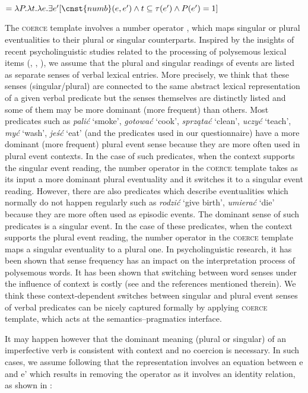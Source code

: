 \documentclass[output=paper]{langscibook}
\begin{document}
\ea {} $= \lambda P. \lambda t.\lambda e. \exists e' [\cnst{numb} (e, e') \wedge t \subseteq \tau(e') \wedge P(e')=1]$\label{jan-bla:fansb:kb:ex30}
\z 

\noindent The \textsc{coerce} template involves a number operator , which maps singular or plural eventualities to their plural or singular counterparts. Inspired by the insights of recent psycholinguistic studies related to the processing of polysemous lexical items (\citealt{KleinandMurphy2002}, \citealt{PylkkanenLlinasandMurphy2006}, \citealt{Frisson2015}), we assume that the plural and singular readings of events are listed as separate senses of verbal lexical entries. More precisely, we think that these senses (singular/plural) are connected to the same abstract lexical representation of a given verbal predicate but the senses themselves are distinctly listed and some of them may be more dominant (more frequent) than others.  Most predicates such as \textit{palić} ‘smoke’, \textit{gotować} ‘cook’, \textit{sprzątać} ‘clean’, \textit{uczyć} ‘teach’, \textit{myć} ‘wash’, \textit{jeść} ‘eat’ (and the predicates used in our questionnaire) have a more dominant (more frequent) plural event sense because they are more often used in plural event contexts. In the case of such predicates, when the context supports the singular event reading, the number operator in the \textsc{coerce} template takes as its input a more dominant plural eventuality and it switches it to a singular event reading. However, there are also predicates which describe eventualities which normally do not happen regularly such as \textit{rodzić} ‘give birth’, \textit{umierać} ‘die’ because they are more often used as episodic events. The dominant sense of such predicates is a singular event. In the case of these predicates, when the context supports the plural event reading, the number operator in the \textsc{coerce} template maps a singular eventuality to a plural one. In psycholinguistic research, it has been shown that sense frequency has an impact on the interpretation process of polysemous words. It has been shown that switching between word senses under the influence of context is costly (see \citealt{Frisson2015} and the references mentioned therein). We think these context-dependent switches between singular and plural event senses of verbal predicates can be nicely captured formally by applying  \textsc{coerce} template, which acts at the semantics--pragmatics interface.

It may happen however that the dominant meaning (plural or singular) of an imperfective verb is consistent with context and no coercion is necessary. In such cases, we assume following \citet{Dolling2014} that the representation involves an equation between e and e’ which results in removing the  operator as it involves an identity relation, as shown in :
\end{document}
